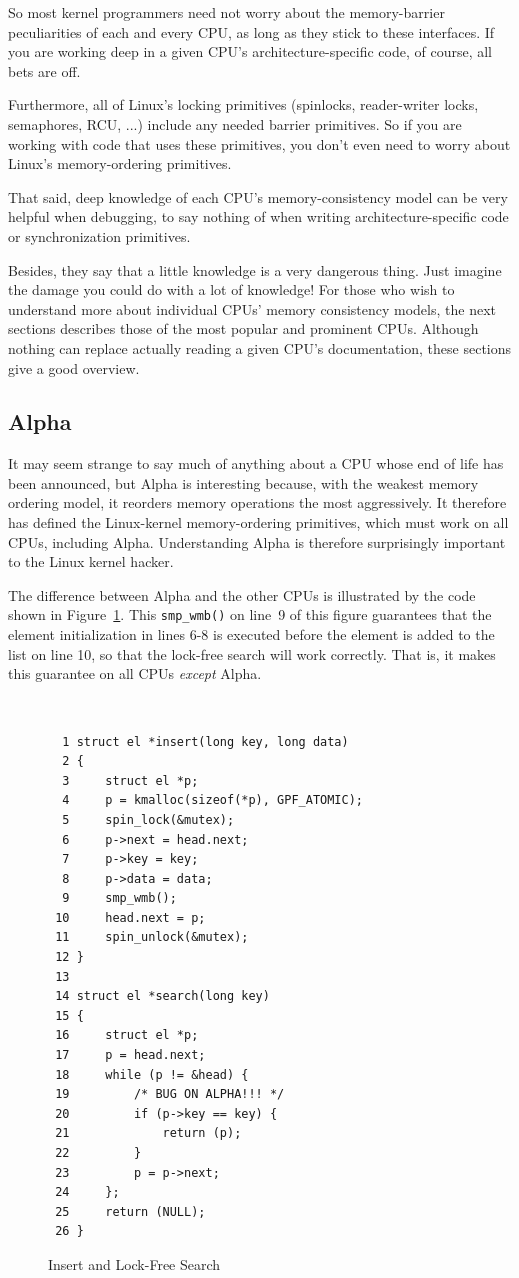 So most kernel programmers need not worry about the memory-barrier
peculiarities of each and every CPU, as long as they stick to these
interfaces.
If you are working deep in a given CPU's architecture-specific code,
of course, all bets are off.

Furthermore,
all of Linux's locking primitives (spinlocks, reader-writer locks,
semaphores, RCU, ...) include any needed barrier primitives.
So if you are working with code that uses these primitives, you don't
even need to worry about Linux's memory-ordering primitives.

That said, deep knowledge of each CPU's memory-consistency model
can be very helpful when debugging, to say nothing of when writing
architecture-specific code or synchronization primitives.

Besides, they say that a little knowledge is a very dangerous thing.
Just imagine the damage you could do with a lot of knowledge!
For those who wish to understand more about individual CPUs'
memory consistency models, the next sections describes those of the
most popular and prominent CPUs.
Although nothing can replace actually reading a given CPU's documentation,
these sections give a good overview.

\subsection{Alpha}

It may seem strange to say much of anything about a CPU whose end of life
has been announced, but Alpha is interesting because, with the weakest
memory ordering model, it reorders memory operations the most aggressively.
It therefore has defined the Linux-kernel memory-ordering primitives,
which must work on all CPUs, including Alpha.
Understanding Alpha is therefore surprisingly important to the Linux kernel
hacker.

The difference between Alpha and the other CPUs is illustrated by the
code shown in
Figure~\ref{fig:app:whymb:Insert and Lock-Free Search}.
This {\tt smp\_wmb()} on line~9 of this figure
guarantees that the element initialization
in lines 6-8 is executed before the element is added to the
list on line 10, so that the lock-free search will work correctly.
That is, it makes this guarantee on all CPUs {\em except} Alpha.

\begin{figure}
{\tt \scriptsize
\begin{verbatim}
  1 struct el *insert(long key, long data)
  2 {
  3     struct el *p;
  4     p = kmalloc(sizeof(*p), GPF_ATOMIC);
  5     spin_lock(&mutex);
  6     p->next = head.next;
  7     p->key = key;
  8     p->data = data;
  9     smp_wmb();
 10     head.next = p;
 11     spin_unlock(&mutex);
 12 }
 13
 14 struct el *search(long key)
 15 {
 16     struct el *p;
 17     p = head.next;
 18     while (p != &head) {
 19         /* BUG ON ALPHA!!! */
 20         if (p->key == key) {
 21             return (p);
 22         }
 23         p = p->next;
 24     };
 25     return (NULL);
 26 }
\end{verbatim}
}
\caption{Insert and Lock-Free Search}
\label{fig:app:whymb:Insert and Lock-Free Search}
\end{figure}

